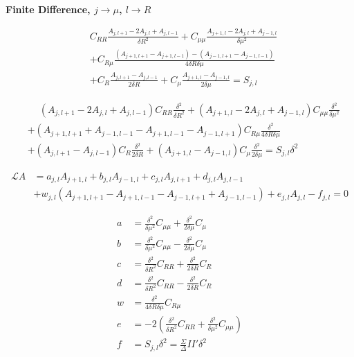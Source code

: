 \documentclass[aps,prd,preprint,groupedaddress]{revtex4-1}
\def\nn{\nonumber}
\begin{document}
{\bf Finite Difference, $j\rightarrow \mu$, $l\rightarrow R$}

\begin{align}
    &C_{RR}\frac{ A_{j,l+1}-2A_{j,l}+ A_{j,l-1} }{\delta R^2}
   +C_{\mu\mu}\frac{ A_{j+1,l}-2A_{j,l}+ A_{j-1,l} }{\delta \mu^2} \nn \\
   &+ C_{R\mu}\frac{(A_{j+1,l+1} - A_{j+1,l-1}) - (A_{j-1,l+1} - A_{j-1,l-1})}{4\delta R\delta \mu}\nn \\
   &+C_R \frac{ A_{j,l+1}- A_{j,l-1} }{2\delta R}
   +C_\mu \frac{ A_{j+1,l}- A_{j-1,l} }{2\delta \mu} = S_{j,l}
\end{align}

\begin{align}
&\phantom{+}
      (A_{j,l+1}-2A_{j,l}+ A_{j,l-1})C_{RR} \frac{\delta^2}{\delta R^2}
   + (A_{j+1,l}-2A_{j,l}+ A_{j-1,l}) C_{\mu\mu} \frac{\delta^2}{\delta \mu^2}\nn \\
&  + (A_{j+1,l+1}+ A_{j-1,l-1} - A_{j+1,l-1} - A_{j-1,l+1}) C_{R\mu}  \frac{\delta^2}{4\delta R\delta \mu}\nn\\
&  + (A_{j,l+1}- A_{j,l-1})C_R  \frac{\delta^2}{2\delta R}
   + (A_{j+1,l}- A_{j-1,l})C_\mu \frac{\delta^2}{2\delta \mu}   = S_{j,l} \delta^2
\end{align}

\begin{align}
\mathcal L A
&= a_{j,l} A_{j+1,l} + b_{j,l} A_{j-1,l} + c_{j,l} A_{j,l+1} + d_{j,l} A_{j,l-1} \nn\\
&+ w_{j,l} (A_{j+1,l+1} - A_{j+1,l-1} - A_{j-1,l+1} + A_{j-1,l-1}) + e_{j,l} A_{j,l} - f_{j,l}=0
\end{align}

\begin{align}
    a &= \frac{\delta^2}{\delta \mu^2} C_{\mu\mu} + \frac{\delta^2}{2\delta \mu} C_\mu \nn\\
    b &= \frac{\delta^2}{\delta \mu^2} C_{\mu\mu} - \frac{\delta^2}{2\delta \mu} C_\mu \nn\\
    c &= \frac{\delta^2}{\delta R^2} C_{RR}  + \frac{\delta^2}{2\delta R} C_R \nn\\
    d &= \frac{\delta^2}{\delta R^2} C_{RR}  - \frac{\delta^2}{2\delta R} C_R \nn\\
    w &= \frac{\delta^2}{4\delta R\delta \mu}C_{R\mu}   \nn \\
    e &= -2\left( \frac{\delta^2}{\delta R^2} C_{RR} + \frac{\delta^2}{\delta \mu^2} C_{\mu\mu}\right)\nn \\
    f &=  S_{j,l} \delta^2  = \frac{\Sigma}{\Delta} II' \delta^2
\end{align}
\end{document}
